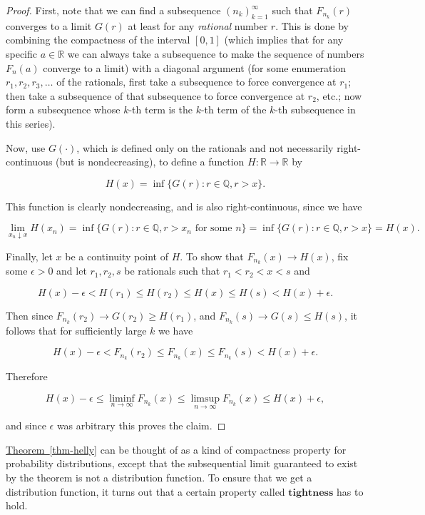 \documentclass[11pt]{report}
\newcommand{\R}{\mathbb{R}}
\theoremstyle{plain}
\theoremstyle{definition}
\begin{document}
\begin{proof}
First, note that we can find a subsequence
$(n_k)_{k=1}^\infty$ such that $F_{n_k}(r)$ converges
to a limit $G(r)$ at least for any \emph{rational} number
$r$. This is done by combining the compactness of the
interval $[0,1]$ (which implies that for any specific
$a\in\R$ we can always take a subsequence to make the
sequence of numbers $F_n(a)$ converge to a limit)
with a diagonal argument (for some enumeration
$r_1, r_2, r_3, \ldots$ of the rationals, first take
a subsequence to force convergence at $r_1$; then
take a subsequence of that subsequence to force
convergence at $r_2$, etc.; now form a subsequence
whose $k$-th term is the $k$-th term of the $k$-th
subsequence in this series).

Now, use $G(\cdot)$, which is defined only on the
rationals and not necessarily right-continuous (but is
nondecreasing), to define a function $H:\R \to \R$ by

\[
H(x) = \inf\{ G(r) : r\in\mathbb{Q}, r>x \}.
\]

\noindent This function is clearly nondecreasing, and is also
right-continuous, since we have

\[
\lim_{x_n \downarrow x} H(x_n) = \inf\{ G(r) : r\in\mathbb{Q}, r>x_n\textrm{ for some }n \}
= \inf\{ G(r) : r\in\mathbb{Q}, r>x \} = H(x).
\]

\noindent Finally, let $x$ be a continuity point of $H$. To
show that $F_{n_k}(x)\to H(x)$, fix some $\epsilon>0$
and let $r_1,r_2,s$ be rationals such that
$r_1 < r_2 < x < s$ and

\[
H(x)-\epsilon < H(r_1) \le H(r_2) \le H(x) \le H(s) < H(x)+\epsilon.
\]

\noindent Then since $F_{n_k}(r_2)\to G(r_2)\ge H(r_1)$, and
$F_{n_k}(s)\to G(s)\le H(s)$, it follows that for
sufficiently large $k$ we have

\[
H(x)-\epsilon < F_{n_k}(r_2) \le F_{n_k}(x) \le F_{n_k}(s) < H(x)+\epsilon.
\]

\noindent Therefore

\[
H(x)-\epsilon \le \liminf_{n\to\infty} F_{n_k}(x) \le \limsup_{n\to\infty} F_{n_k}(x) \le H(x)+\epsilon,
\]

\noindent and since $\epsilon$ was arbitrary this proves the
claim.
\end{proof}

\noindent \hyperref[thm-helly]{Theorem~\ref*{thm-helly}} can be thought of as a kind of
compactness property for probability distributions,
except that the subsequential limit guaranteed to
exist by the theorem is not a distribution function.
To ensure that we get a distribution function, it
turns out that a certain property called
$\textbf{tightness}$ has to hold.
\end{document}
